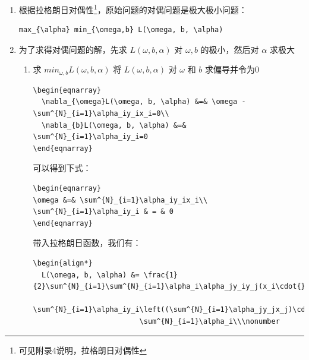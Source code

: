 \documentclass[11pt]{ctexart}
\begin{document}
\begin{enumerate}
\begin{enumerate}
\begin{lstlisting}
\begin{equation}
  L(\omega,b,\alpha) = \frac{1}{2}||\omega||^2-\sum^{N}_{i=1}\alpha_iy_i(\omega\cdot{}x_i+b)+\sum^{N}_{i=1}\alpha_i
\end{equation}
\end{lstlisting}
其中， \(\alpha=(\alpha_1,\alpha_2,\ldots,\alpha_N)^T\) 为拉格朗日乘子向量
\item 根据拉格朗日对偶性\footnote{可见附录4说明，拉格朗日对偶性}，原始问题的对偶问题是极大极小问题：
\lstset{language=[LaTeX]TeX,label= ,caption= ,captionpos=b,numbers=none}
\begin{lstlisting}
max_{\alpha} min_{\omega,b} L(\omega, b, \alpha)
\end{lstlisting}
\item 为了求得对偶问题的解，先求 \(L(\omega, b, \alpha)\) 对 \(\omega,b\) 的极小，然后对 \(\alpha\) 求极大
\begin{enumerate}
\item 求 \(min_{\omega, b}L(\omega,b,\alpha)\)
      将 \(L(\omega, b, \alpha)\) 对 \(\omega\) 和 \(b\) 求偏导并令为0
\lstset{language=[LaTeX]TeX,label= ,caption= ,captionpos=b,numbers=none}
\begin{lstlisting}
\begin{eqnarray}
  \nabla_{\omega}L(\omega, b, \alpha) &=& \omega - \sum^{N}_{i=1}\alpha_iy_ix_i=0\\
  \nabla_{b}L(\omega, b, \alpha) &=& \sum^{N}_{i=1}\alpha_iy_i=0
\end{eqnarray}
\end{lstlisting}
可以得到下式：
\lstset{language=[LaTeX]TeX,label= ,caption= ,captionpos=b,numbers=none}
\begin{lstlisting}
\begin{eqnarray}
\omega &=& \sum^{N}_{i=1}\alpha_iy_ix_i\\
\sum^{N}_{i=1}\alpha_iy_i & = & 0
\end{eqnarray}
\end{lstlisting}
带入拉格朗日函数，我们有：
\lstset{language=[LaTeX]TeX,label= ,caption= ,captionpos=b,numbers=none}
\begin{lstlisting}
\begin{align*}
  L(\omega, b, \alpha) &= \frac{1}{2}\sum^{N}_{i=1}\sum^{N}_{i=1}\alpha_i\alpha_jy_iy_j(x_i\cdot{}x_j)-
                         \sum^{N}_{i=1}\alpha_iy_i\left((\sum^{N}_{i=1}\alpha_jy_jx_j)\cdot{}x_i+b\right)+
                         \sum^{N}_{i=1}\alpha_i\\\nonumber

\end{lstlisting}
\end{enumerate}
\end{enumerate}
\end{enumerate}
\end{document}
